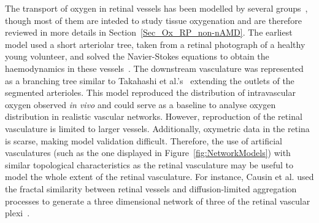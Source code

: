 \documentclass{article}
\begin{document}
The transport of oxygen in retinal vessels has been modelled by several groups~\cite{Causin_2015,Fry_et_al_2018,Liu_2009}, though most of them are inteded to study tissue oxygenation and are therefore reviewed in more details in Section~\ref{Sec_Ox_RP_non-nAMD}.
The earliest model used a short arteriolar tree, taken from a retinal photograph of a healthy young volunteer, and solved the Navier-Stokes equations to obtain the haemodynamics in these vessels~\cite{Liu_2009}.
The downstream vasculature was represented as a branching tree similar to Takahashi et al.'s~\cite{Takahashi_2009} extending the outlets of the segmented arterioles.
This model reproduced the distribution of intravascular oxygen observed \textit{in vivo} and could serve as a baseline to analyse oxygen distribution in realistic vascular networks.
However, reproduction of the retinal vasculature is limited to larger vessels.
Additionally, oxymetric data in the retina is scarse, making model validation difficult.
Therefore, the use of artificial vasculatures (such as the one displayed in Figure~\ref{fig:NetworkModels}) with similar topological characteristics as the retinal vasculature may be useful to model the whole extent of the retinal vasculature.
For instance, Causin et al. used the fractal similarity between retinal vessels and diffusion-limited aggregation processes to generate a three dimensional network of three of the retinal vascular plexi~\cite{Causin_2015}.
\end{document}
